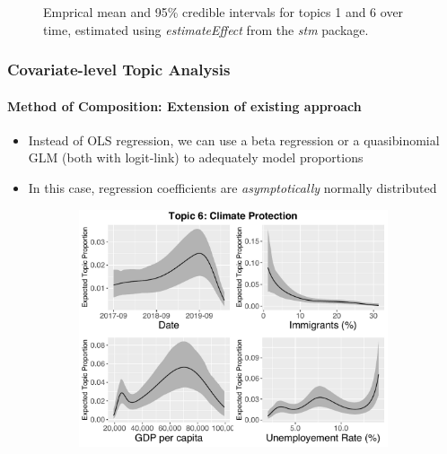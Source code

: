 \documentclass[xcolor=dvipsnames]{beamer}
\begin{document}
\begin{frame}
\begin{figure}[h!]
\begin{subfigure}[b]{0.4\linewidth}
  \end{subfigure}
  \caption{Emprical mean and 95\% credible intervals for topics 1 and 6 over time, estimated using \textit{estimateEffect} from the \textit{stm} package.}
  \label{fig:estEffect_topic16}
\end{figure}
\end{frame}

\begin{frame}
\frametitle{Covariate-level Topic Analysis}
\framesubtitle{Method of Composition: Extension of existing approach}
\begin{itemize}
\item Instead of OLS regression, we can use a beta regression or a quasibinomial GLM (both with logit-link) to adequately model proportions
\item In this case, regression coefficients are \textit{asymptotically} normally distributed
\end{itemize}
\begin{figure}[h!]
  \centering
  \captionsetup{justification=centering,margin=2cm}
  \begin{subfigure}[b]{0.4\linewidth}
    \includegraphics[width=\linewidth]{../../plots/presentation/quasi_t6_cont.pdf}
  \end{subfigure}
  \begin{subfigure}[b]{0.4\linewidth}

\end{subfigure}
\end{figure}
\end{frame}
\end{document}
